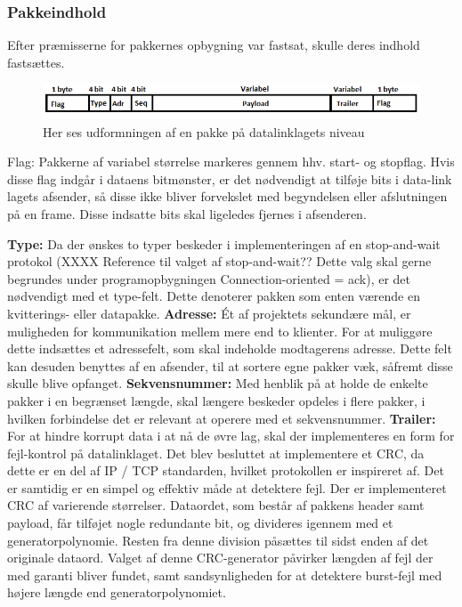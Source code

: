 \subsubsection{Pakkeindhold}
Efter præmisserne for pakkernes opbygning var fastsat, skulle deres indhold fastsættes. 

\begin{figure}[h]
\centering
\includegraphics[scale=0.8]{Billeder/DataLinkFrame.PNG}
\caption{Her ses udformningen af en pakke på datalinklagets niveau}
\label{fig:DataLinkFrame}
\end{figure}

Flag: Pakkerne af variabel størrelse markeres gennem hhv. start- og stopflag. Hvis disse flag indgår i dataens bitmønster, er det nødvendigt at tilføje bits i data-link lagets afsender, så disse ikke bliver forvekslet med begyndelsen eller afslutningen på en frame. Disse indsatte bits skal ligeledes fjernes i afsenderen. 

\textbf{Type:} Da der ønskes to typer beskeder i implementeringen af en stop-and-wait protokol (XXXX Reference til valget af stop-and-wait?? Dette valg skal gerne begrundes under programopbygningen Connection-oriented = ack), er det nødvendigt med et type-felt. Dette denoterer pakken som enten værende en kvitterings- eller datapakke.
\textbf{Adresse:} Ét af projektets sekundære mål, er muligheden for kommunikation mellem mere end to klienter. For at muliggøre dette indsættes et adressefelt, som skal indeholde modtagerens adresse. Dette felt kan desuden benyttes af en afsender, til at sortere egne pakker væk, såfremt disse skulle blive opfanget.
\textbf{Sekvensnummer:} Med henblik på at holde de enkelte pakker i en begrænset længde, skal længere beskeder opdeles i flere pakker, i hvilken forbindelse det er relevant at operere med et sekvensnummer.
\textbf{Trailer:} For at hindre korrupt data i at nå de øvre lag, skal der implementeres en form for fejl-kontrol på datalinklaget. Det blev besluttet at implementere et CRC, da dette er en del af IP / TCP standarden, hvilket protokollen er inspireret af. Det er samtidig er en simpel og effektiv måde at detektere fejl.
Der er implementeret CRC af varierende størrelser. Dataordet, som består af pakkens header samt payload, får tilføjet nogle redundante bit, og divideres igennem med et generatorpolynomie. Resten fra denne division påsættes til sidst enden af det originale dataord.	Valget af denne CRC-generator påvirker længden af fejl der med garanti bliver fundet, samt sandsynligheden for at detektere burst-fejl med højere længde end generatorpolynomiet.

